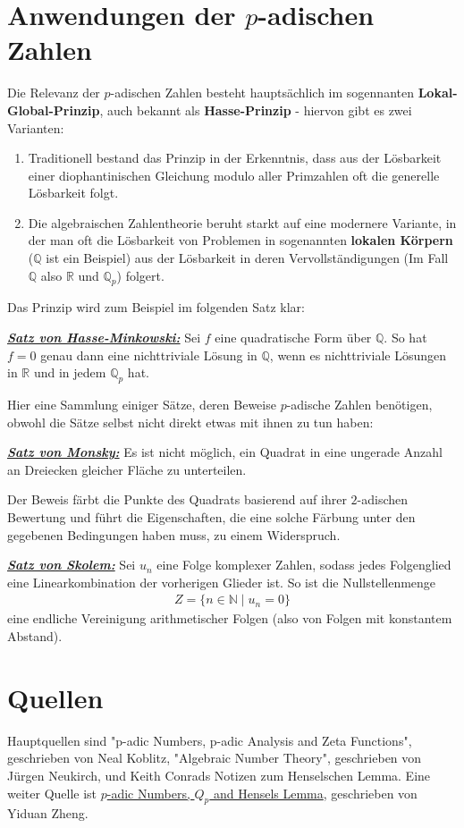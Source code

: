 \documentclass{report}
\newcommand*{\newpar}{\par\vspace{\baselineskip}\noindent}
\newcommand{\tbf}[1]{\textbf{#1}}
\newcommand{\ul}[1]{\underline{#1}}
\newcommand{\theoremname}[1]{\emph{\tbf{\ul{#1}}}}
\newcommand{\bN}{\mathbb{N}}
\newcommand{\bQ}{\mathbb{Q}}
\newcommand{\bR}{\mathbb{R}}
\begin{document}
	\chapter{Anwendungen der $p$-adischen Zahlen}
	Die Relevanz der $p$-adischen Zahlen besteht hauptsächlich im sogennanten \tbf{Lokal-Global-Prinzip}, auch bekannt als \tbf{Hasse-Prinzip} - hiervon gibt es zwei Varianten:
	\begin{enumerate}
		\item Traditionell bestand das Prinzip in der Erkenntnis, dass aus der Lösbarkeit einer diophantinischen Gleichung modulo aller Primzahlen oft die generelle Lösbarkeit folgt.
		\item Die algebraischen Zahlentheorie beruht starkt auf eine modernere Variante, in der man oft die Lösbarkeit von Problemen in sogenannten \tbf{lokalen Körpern} ($\bQ$ ist ein Beispiel) aus der Lösbarkeit in deren Vervollständigungen (Im Fall $\bQ$ also $\bR$ und $\bQ_p$) folgert.
	\end{enumerate}
	Das Prinzip wird zum Beispiel im folgenden Satz klar:
	\begin{proposition}
		\theoremname{Satz von Hasse-Minkowski:} Sei $f$ eine quadratische Form über $\bQ$. So hat $f = 0$ genau dann eine nichttriviale Lösung in $\bQ$, wenn es nichttriviale Lösungen in $\bR$ und in jedem $\bQ_p$ hat.
	\end{proposition}
	\newpar
	Hier eine Sammlung einiger Sätze, deren Beweise $p$-adische Zahlen benötigen, obwohl die Sätze selbst nicht direkt etwas mit ihnen zu tun haben:
	\begin{proposition}
		\theoremname{Satz von Monsky:} Es ist nicht möglich, ein Quadrat in eine ungerade Anzahl an Dreiecken gleicher Fläche zu unterteilen.
	\end{proposition}
	\noindent Der Beweis färbt die Punkte des Quadrats basierend auf ihrer $2$-adischen Bewertung und führt die Eigenschaften, die eine solche Färbung unter den gegebenen Bedingungen haben muss, zu einem Widerspruch.
	\begin{proposition}
		\theoremname{Satz von Skolem:} Sei $u_n$ eine Folge komplexer Zahlen, sodass jedes Folgenglied eine Linearkombination der vorherigen Glieder ist. So ist die Nullstellenmenge 
		\begin{align*}
			Z = \{n \in \bN \mid u_n = 0\}
		\end{align*}
		eine endliche Vereinigung arithmetischer Folgen (also von Folgen mit konstantem Abstand).
	\end{proposition}
	\chapter{Quellen}
	Hauptquellen sind "p-adic Numbers, p-adic Analysis and Zeta Functions", geschrieben von Neal Koblitz, "Algebraic Number Theory", geschrieben von Jürgen Neukirch, und Keith Conrads Notizen zum Henselschen Lemma. Eine weiter Quelle ist \href{https://math.uchicago.edu/~may/REU2020/REUPapers/Zheng,Yiduan.pdf}{$p$-adic Numbers, $Q_p$ and Hensels Lemma}, geschrieben von Yiduan Zheng.
\end{document}
